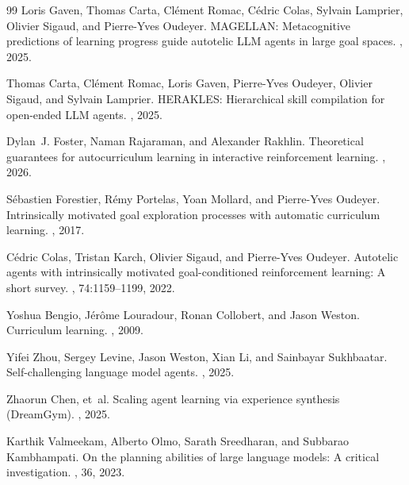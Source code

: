 \documentclass[11pt,a4paper]{article}
\begin{document}
\begin{thebibliography}{99}
Loris Gaven, Thomas Carta, Clément Romac, Cédric Colas, Sylvain Lamprier, Olivier Sigaud, and Pierre-Yves Oudeyer.
\newblock MAGELLAN: Metacognitive predictions of learning progress guide autotelic LLM agents in large goal spaces.
, 2025.

Thomas Carta, Clément Romac, Loris Gaven, Pierre-Yves Oudeyer, Olivier Sigaud, and Sylvain Lamprier.
\newblock HERAKLES: Hierarchical skill compilation for open-ended LLM agents.
, 2025. %

Dylan~J. Foster, Naman Rajaraman, and Alexander Rakhlin.
\newblock Theoretical guarantees for autocurriculum learning in interactive reinforcement learning.
, 2026. %

Sébastien Forestier, Rémy Portelas, Yoan Mollard, and Pierre-Yves Oudeyer.
\newblock Intrinsically motivated goal exploration processes with automatic curriculum learning.
, 2017.

Cédric Colas, Tristan Karch, Olivier Sigaud, and Pierre-Yves Oudeyer.
\newblock Autotelic agents with intrinsically motivated goal-conditioned reinforcement learning: A short survey.
, 74:1159--1199, 2022.

Yoshua Bengio, Jérôme Louradour, Ronan Collobert, and Jason Weston.
\newblock Curriculum learning.
, 2009.

Yifei Zhou, Sergey Levine, Jason Weston, Xian Li, and Sainbayar Sukhbaatar.
\newblock Self-challenging language model agents.
, 2025.

Zhaorun Chen, et~al.
\newblock Scaling agent learning via experience synthesis (DreamGym).
, 2025.

Karthik Valmeekam, Alberto Olmo, Sarath Sreedharan, and Subbarao Kambhampati.
\newblock On the planning abilities of large language models: A critical investigation.
, 36, 2023.


\end{thebibliography}
\end{document}
